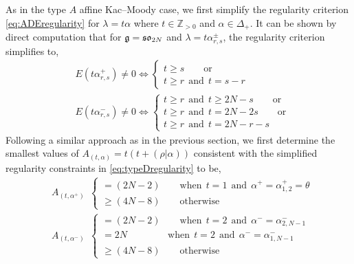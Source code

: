 As in the type $A$ affine Kac--Moody case, we first simplify the regularity criterion \eqref{eq:ADEregularity} for $\lambda = t \alpha$ where $t \in \mathbb{Z}_{>0}$ and $\alpha \in \Delta_+$. It can be shown by direct computation that for $\mathfrak{g} = \mathfrak{so}_{2N}$ and $\lambda = t \alpha^{\pm}_{r,s}$, the regularity criterion simplifies to,
\begin{equation} \label{eq:typeDregularity}
\begin{split}
     &E(t \alpha^+_{r,s}) \neq 0 \Longleftrightarrow \begin{cases}
         t \geqslant s \qquad \text{or} \\ 
         t \geqslant r \ \ \text{and} \ \ t = s - r
     \end{cases} \\
     &E(t \alpha^-_{r,s}) \neq 0 \Longleftrightarrow \begin{cases}
         t \geqslant r \ \ \text{and} \ \ t \geqslant 2N - s \qquad \text{or} \\ 
         t \geqslant r \ \ \text{and} \ \ t = 2N - 2s \qquad \text{or} \\ 
         t \geqslant r \ \ \text{and} \ \ t = 2N-r-s
     \end{cases}     
\end{split}
\end{equation}
Following a similar approach as in the previous section, we first determine the smallest values of $A_{(t,\alpha)} = t(t+(\rho|\alpha))$ consistent with the simplified regularity constraints in \eqref{eq:typeDregularity} to be,
\begin{equation} \label{eq:AtconsttypeD}
\begin{split}
    &A_{(t,\alpha^+)} \ \ \begin{cases}
        = (2N-2) \qquad \text{when} \ \ t = 1 \ \ \text{and} \ \ \alpha^+ = \alpha^+_{1,2} = \theta \\ \geqslant (4N-8) \qquad \text{otherwise}
    \end{cases} \\
    &A_{(t,\alpha^-)} \ \ \begin{cases}
        = (2N-2) \qquad \text{when} \ \ t = 2 \ \ \text{and} \ \ \alpha^- = \alpha^-_{2,N-1} \\
        = 2N \qquad \qquad \ \text{when} \ \ t = 2 \ \ \text{and} \ \ \alpha^- = \alpha^-_{1,N-1} \\ \geqslant (4N-8) \qquad \text{otherwise}
    \end{cases}
\end{split}
\end{equation}

